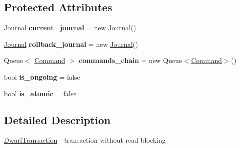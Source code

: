\subsection*{Protected Attributes}
\begin{DoxyCompactItemize}
\item 
\hypertarget{class_dwarf_d_b_1_1_transactions_1_1_dwarf_transaction_ac669e201c78debaf241d4ae53bb8c8b6}{\hyperlink{class_dwarf_d_b_1_1_transaction_journals_1_1_journal}{Journal} {\bfseries current\+\_\+journal} = new \hyperlink{class_dwarf_d_b_1_1_transaction_journals_1_1_journal}{Journal}()}\label{class_dwarf_d_b_1_1_transactions_1_1_dwarf_transaction_ac669e201c78debaf241d4ae53bb8c8b6}

\item 
\hypertarget{class_dwarf_d_b_1_1_transactions_1_1_dwarf_transaction_a619358ab756eca4ff000419621e59aac}{\hyperlink{class_dwarf_d_b_1_1_transaction_journals_1_1_journal}{Journal} {\bfseries rollback\+\_\+journal} = new \hyperlink{class_dwarf_d_b_1_1_transaction_journals_1_1_journal}{Journal}()}\label{class_dwarf_d_b_1_1_transactions_1_1_dwarf_transaction_a619358ab756eca4ff000419621e59aac}

\item 
\hypertarget{class_dwarf_d_b_1_1_transactions_1_1_dwarf_transaction_aed2da7c0b57d388603a0c229003381bb}{Queue$<$ \hyperlink{class_dwarf_d_b_1_1_dwarf_command_1_1_command}{Command} $>$ {\bfseries commands\+\_\+chain} = new Queue$<$\hyperlink{class_dwarf_d_b_1_1_dwarf_command_1_1_command}{Command}$>$()}\label{class_dwarf_d_b_1_1_transactions_1_1_dwarf_transaction_aed2da7c0b57d388603a0c229003381bb}

\item 
\hypertarget{class_dwarf_d_b_1_1_transactions_1_1_dwarf_transaction_af7c5ad53ad36cfa8537bf9faf0c0f694}{bool {\bfseries is\+\_\+ongoing} = false}\label{class_dwarf_d_b_1_1_transactions_1_1_dwarf_transaction_af7c5ad53ad36cfa8537bf9faf0c0f694}

\item 
\hypertarget{class_dwarf_d_b_1_1_transactions_1_1_dwarf_transaction_afcb3f9b3732ab553abd49f939696178e}{bool {\bfseries is\+\_\+atomic} = false}\label{class_dwarf_d_b_1_1_transactions_1_1_dwarf_transaction_afcb3f9b3732ab553abd49f939696178e}

\end{DoxyCompactItemize}


\subsection{Detailed Description}
\hyperlink{class_dwarf_d_b_1_1_transactions_1_1_dwarf_transaction}{Dwarf\+Transaction} -\/ transaction without read blocking 



